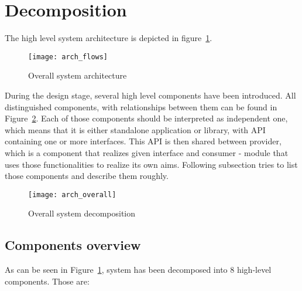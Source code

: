 %
\section{Decomposition}
\label{sec:arch_decomposition}

The high level system architecture is depicted in figure~\ref{fig:arch_overall}. 

\begin{figure}[ht]
\centering
\texttt{[image: arch\_flows]}
\caption{Overall system architecture}
\label{fig:arch_overall}
\end{figure}

During the design stage, several high level components have been introduced. All distinguished components, with relationships between them can be found in Figure~\ref{fig:decomposition_overall}. Each of those components should be interpreted as independent one, which means that it is either standalone application or library, with API containing one or more interfaces. This API is then shared between provider, which is a component that realizes given interface and consumer - module that uses those functionalities to realize its own aims. Following subsection tries to list those components and describe them roughly.

\begin{figure}[ht]
\centering
\texttt{[image: arch\_overall]}
\caption{Overall system decomposition}
\label{fig:decomposition_overall}
\end{figure}

\subsection{Components overview}

As can be seen in Figure~\ref{fig:arch_overall}, system has been decomposed into 8 high-level components. Those are:

